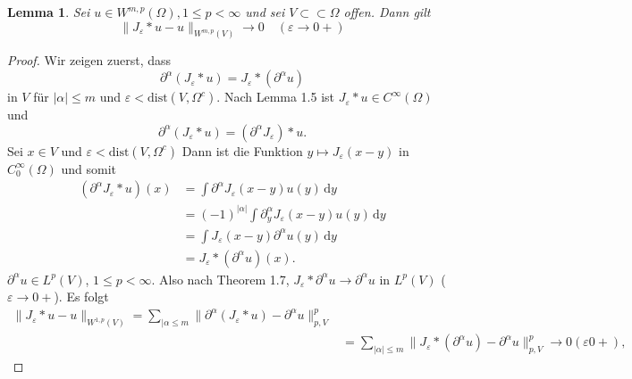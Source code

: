 \documentclass[
paper=a4,
bibtotocnumbered,
liststotocnumbered,
tablecaptionabove,
pointlessnumbers,
twoside,
openright,
10pt
]
{report}
\newtheorem{lem}[thm]{Lemma}
\theoremstyle{definition}
\numberwithin{equation}{chapter}
\begin{document}
\begin{lem}\label{2.6}
Sei $u\in W^{m,p}(\Omega), 1 \le p <\infty$ und sei $V\subset \subset \Omega$ offen. Dann gilt
$$
\| J_\varepsilon * u - u\|_{W^{m,p}(V)} \to 0 \quad (\varepsilon \rightarrow 0 +)
$$
\end{lem}
\begin{proof}
Wir zeigen zuerst, dass
$$
\partial^\alpha (J_\varepsilon * u) = J_\varepsilon * (\partial^\alpha u)
$$
in $V$ für $|\alpha|\le m$ und $\varepsilon < \text{dist} (V, \Omega^c)$. Nach Lemma 1.5 ist $J_\varepsilon * u\in C^\infty(\Omega)$ und 
$$
\partial^\alpha (J_\varepsilon * u) = ( \partial^\alpha J_\varepsilon) * u.
$$
Sei $x\in V$ und $\varepsilon < \text{dist}(V, \Omega^c)$ Dann ist die Funktion 
$y\mapsto J_\varepsilon(x-y)$ in $C_0^\infty(\Omega)$ und somit 
\begin{align*}
(\partial^\alpha J_\varepsilon * u) (x)&= \int \partial^\alpha J_\varepsilon (x-y) u(y) \, \mathrm dy\\
&= (-1)^{|\alpha|} \int \partial_y^\alpha J_{\varepsilon} (x-y) u(y) \, \mathrm dy \\
&= \int J_\varepsilon (x-y) \partial^\alpha u(y) \, \mathrm dy \\
&= J_\varepsilon * (\partial^\alpha u) (x).
\end{align*}
$\partial^\alpha u \in L^p(V)$, $1\le p <\infty$. Also nach Theorem 1.7, $J_\varepsilon * \partial^\alpha u \to \partial^\alpha u$ in $L^p(V)$ ($\varepsilon \to 0 +$). Es folgt
\begin{align*}
\| J_\varepsilon * u - u \|_{W^{1,p}(V)} = \sum_{|\alpha \le m} \| \partial^\alpha (J_\varepsilon * u) - \partial^\alpha u \|^p_{p,V}\\
&= \sum_{|\alpha|\le m} \| J_\varepsilon * (\partial^\alpha u) - \partial^\alpha u \|_{p,V}^p \to 0 (\varepsilon 0 +),
\end{align*}
\end{proof}
\end{document}
